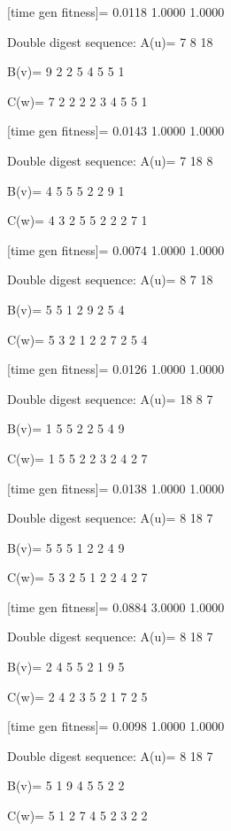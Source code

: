 [time gen fitness]=
    0.0118    1.0000    1.0000

Double digest sequence:
A(u)=
     7     8    18

B(v)=
     9     2     2     5     4     5     5     1

C(w)=
     7     2     2     2     2     3     4     5     5     1

[time gen fitness]=
    0.0143    1.0000    1.0000

Double digest sequence:
A(u)=
     7    18     8

B(v)=
     4     5     5     5     2     2     9     1

C(w)=
     4     3     2     5     5     2     2     2     7     1

[time gen fitness]=
    0.0074    1.0000    1.0000

Double digest sequence:
A(u)=
     8     7    18

B(v)=
     5     5     1     2     9     2     5     4

C(w)=
     5     3     2     1     2     2     7     2     5     4

[time gen fitness]=
    0.0126    1.0000    1.0000

Double digest sequence:
A(u)=
    18     8     7

B(v)=
     1     5     5     2     2     5     4     9

C(w)=
     1     5     5     2     2     3     2     4     2     7

[time gen fitness]=
    0.0138    1.0000    1.0000

Double digest sequence:
A(u)=
     8    18     7

B(v)=
     5     5     5     1     2     2     4     9

C(w)=
     5     3     2     5     1     2     2     4     2     7

[time gen fitness]=
    0.0884    3.0000    1.0000

Double digest sequence:
A(u)=
     8    18     7

B(v)=
     2     4     5     5     2     1     9     5

C(w)=
     2     4     2     3     5     2     1     7     2     5

[time gen fitness]=
    0.0098    1.0000    1.0000

Double digest sequence:
A(u)=
     8    18     7

B(v)=
     5     1     9     4     5     5     2     2

C(w)=
     5     1     2     7     4     5     2     3     2     2

